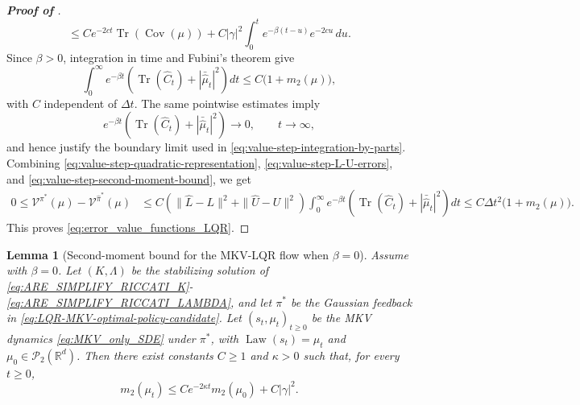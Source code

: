 \documentclass[a4paper, 10pt, english, reqno]{amsart}
\DeclareMathOperator*{\Law}{\text{Law}}
\newtheorem{lemma}[theorem]{Lemma}
\begin{document}
\begin{proof}[\textbf{Proof of }]
\[\le
Ce^{-2ct}\operatorname{Tr}(\operatorname{Cov}(\mu))
+
C|\gamma|^2
\int_0^t e^{-\beta(t-u)}e^{-2cu}\,du.
\]
Since $\beta>0$, integration in time and Fubini's theorem give
\begin{equation}
\label{eq:value-step-second-moment-bound}
\int_0^\infty e^{-\beta t}
\left(
\operatorname{Tr}(\hat C_t)+|\bar{\hat\mu}_t|^2
\right)dt
\le
C\bigl(1+m_2(\mu)\bigr),
\end{equation}
with $C$ independent of $\Delta t$. The same pointwise estimates imply
\[
e^{-\beta t}
\left(
\operatorname{Tr}(\hat C_t)+|\bar{\hat\mu}_t|^2
\right)
\longrightarrow0,
\qquad t\to\infty,
\]
and hence justify the boundary limit used in
\eqref{eq:value-step-integration-by-parts}.
Combining \eqref{eq:value-step-quadratic-representation}, \eqref{eq:value-step-L-U-errors}, and \eqref{eq:value-step-second-moment-bound}, we get
\begin{align*}
0
\le
\mathcal V^{\pi^*}(\mu)-\mathcal V^{\hat\pi^*}(\mu)
&\le
C\left(\|\hat L-L\|^2+\|\hat U-U\|^2\right)
\int_0^\infty e^{-\beta t}
\left(
\operatorname{Tr}(\hat C_t)+|\bar{\hat\mu}_t|^2
\right)dt\le
C\Delta t^2\bigl(1+m_2(\mu)\bigr).
\end{align*}
This proves \eqref{eq:error_value_functions_LQR}.
\end{proof}

\begin{lemma}[Second-moment bound for the MKV-LQR flow when $\beta=0$]
\label{lem:m2-bound-beta-zero-lqr-mkv}
Assume  with $\beta=0$. Let $(K,\Lambda)$ be the stabilizing solution of \eqref{eq:ARE_SIMPLIFY_RICCATI_K}-\eqref{eq:ARE_SIMPLIFY_RICCATI_LAMBDA}, and let $\pi^*$ be the Gaussian feedback in \eqref{eq:LQR-MKV-optimal-policy-candidate}. Let $(s_t,\mu_t)_{t\ge0}$ be the MKV dynamics \eqref{eq:MKV_only_SDE} under $\pi^*$, with $\Law(s_t)=\mu_t$ and $\mu_0\in\mathcal P_2(\mathbb R^d)$. Then there exist constants $C\ge1$ and $\kappa>0$ such that, for every $t\ge0$,
\[
m_2(\mu_t)
\le
C e^{-2\kappa t}m_2(\mu_0)+C|\gamma|^2.
\]
\end{lemma}
\end{document}
